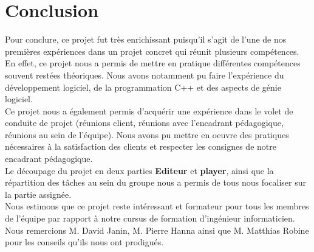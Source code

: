\chapter{Conclusion}
\indent Pour conclure, ce projet fut très enrichissant puisqu’il s’agit de l'une de nos premières expériences dans un projet concret qui réunit plusieurs compétences. En effet, ce projet nous a permis de mettre en pratique différentes compétences souvent restées théoriques. Nous avons notamment pu faire l'expérience du développement logiciel, de la programmation C++ et des aspects de génie logiciel.\\
\indent Ce projet nous a également permis d'acquérir une expérience dans le volet de conduite de projet (réunions client, réunions avec l'encadrant pédagogique, réunions au sein de l'équipe). Nous avons pu mettre en oeuvre des pratiques nécessaires à la satisfaction des clients et respecter les consignes de notre encadrant pédagogique.\\
\indent Le découpage du projet en deux parties \textbf{Editeur} et \textbf{player}, ainsi que la répartition des tâches au sein du groupe nous a permis de tous nous focaliser sur la partie assignée.\\
Nous estimons que ce projet reste intéressant et formateur pour tous les membres de l'équipe par rapport à notre cursus de formation d'ingénieur informaticien.\\


Nous remercions M. David Janin, M. Pierre Hanna ainsi que M. Matthias Robine pour les conseils qu'ils nous ont prodigués.
